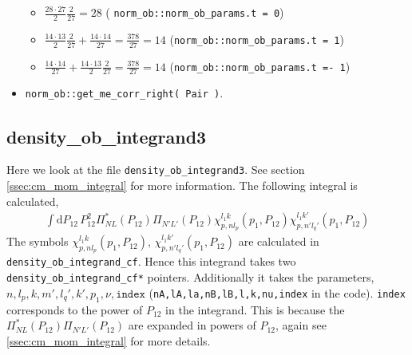 \documentclass[10pt]{article}
\begin{document}
\begin{itemize}
{\begin{itemize}
	\item $ \frac{ 28 \cdot 27}{2} \frac{2}{27} = 28$ ( \texttt{norm\_ob::norm\_ob\_params.t = 0}) 
	\item $ \frac{ 14 \cdot 13}{2} \frac{2}{27} + \frac{14 \cdot 14 }{27} = \frac{378}{27} = 14 $ (\texttt{norm\_ob::norm\_ob\_params.t~=~1}) \\
	\item $ \frac{14 \cdot 14 }{27} + \frac{ 14 \cdot 13}{2} \frac{2}{27} = \frac{378}{27} = 14 $ (\texttt{norm\_ob::norm\_ob\_params.t~=-~1}) \\
	\end{itemize}
	}
	\item \texttt{norm\_ob::get\_me\_corr\_right( Pair )}.
\end{itemize}

\subsection{ density\_ob\_integrand3 }
Here we look at the file \texttt{density\_ob\_integrand3}. See section \ref{ssec:cm_mom_integral} for more information. The following integral is calculated,
\begin{align*}
\int \text{d} P_{12} \, P_{12}^{2} \Pi^{*}_{N L}(P_{12}) \Pi_{N' L'}(P_{12}) \chi_{p,nl_p}^{l_1 k}(p_1,P_{12}) \chi_{p,n'l_q'}^{l_1 k'}(p_1,P_{12}) 
\end{align*}
The symbols $\chi_{p,nl_p}^{l_1 k}(p_1,P_{12})$, $\chi_{p,n'l_q'}^{l_1 k'}(p_1,P_{12})$ are calculated in \texttt{density\_ob\_integrand\_cf}. Hence this integrand takes two \texttt{density\_ob\_integrand\_cf*} pointers. Additionally it takes the parameters, $n,l_p,k,m',l_q',k',p_1,\nu,\texttt{index}$ (\texttt{nA,lA,la,nB,lB,l,k,nu,index} in the code). \texttt{index} corresponds to the power of $P_{12}$ in the integrand. This is because the $\Pi^{*}_{N L}(P_{12}) \Pi_{N' L'}(P_{12})$ are expanded in powers of $P_{12}$, again see \ref{ssec:cm_mom_integral} for more details.
\end{document}
